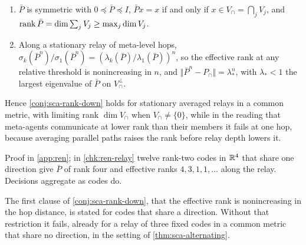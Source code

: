 \begin{proposition}\label{prop:ren-relay-rank}
\begin{enumerate}
\item[(a)] $\bar P$ is symmetric with $0\preceq\bar P\preceq I$, $\bar Px=x$ if and only if $x\in V_\cap=\bigcap_jV_j$, and $\operatorname{rank}\bar P=\dim\sum_jV_j\ge\max_j\dim V_j$.
\item[(b)] Along a stationary relay of meta-level hops, $\sigma_k(\bar P^n)/\sigma_1(\bar P^n)=(\lambda_k(\bar P)/\lambda_1(\bar P))^n$, so the effective rank at any relative threshold is nonincreasing in $n$, and $\Vert\bar P^n-P_\cap\Vert=\lambda_\ast^n$, with $\lambda_\ast<1$ the largest eigenvalue of $\bar P$ on $V_\cap^\perp$.
\end{enumerate}
Hence \cref{conj:sca-rank-down} holds for stationary averaged relays in a common metric, with limiting rank $\dim V_\cap$ when $V_\cap\neq\{0\}$, while in the reading that meta-agents communicate at lower rank than their members it fails at one hop, because averaging parallel paths raises the rank before relay depth lowers it.
\end{proposition}
Proof in \cref{app:ren}; in \cref{chk:ren-relay} twelve rank-two codes in $\mathbb{R}^4$ that share one direction give $\bar P$ of rank four and effective ranks $4,3,1,1,\dots$ along the relay. Decisions aggregate as codes do.

The first clause of \cref{conj:sca-rank-down}, that the effective rank is nonincreasing in the hop distance, is stated for codes that share a direction. Without that restriction it fails, already for a relay of three fixed codes in a common metric that share no direction, in the setting of \cref{thm:sca-alternating}.


